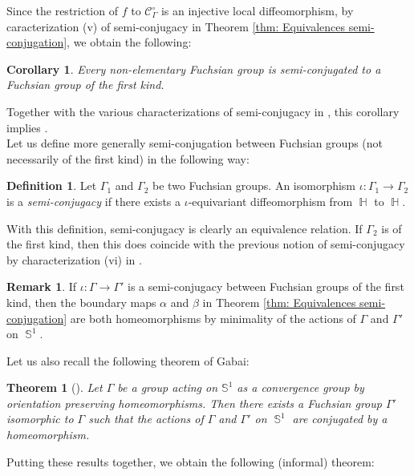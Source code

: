\documentclass{amsart}
\theoremstyle{plain}
\newtheorem{theorem}[proposition]{Theorem}
\newtheorem{corollary}[proposition]{Corollary}
\theoremstyle{definition}
\newtheorem{definition}[proposition]{Definition}
\newtheorem{remark}[proposition]{Remark}
\DeclareMathOperator{\Hb}{\mathbb{H}}
\DeclareMathOperator{\Sb}{\mathbb{S}}
\newcommand{\1}{\mathbf{1}}
\begin{document}
Since the restriction of $f$ to $\mathcal C^\circ_\Gamma$ is an injective local diffeomorphism, by caracterization (v) of semi-conjugacy in Theorem \ref{thm: Equivalences semi-conjugation}, we obtain the following:
\begin{corollary} \label{coro:Fuchsian group conjugated to first kind}
    Every non-elementary Fuchsian group is semi-conjugated to a Fuchsian group of the first kind.
\end{corollary}
Together with the various characterizations of semi-conjugacy in , this corollary implies .\\


Let us define more generally semi-conjugation between Fuchsian groups (not necessarily of the first kind) in the following way:
\begin{definition}
    Let $\Gamma_1$ and $\Gamma_2$ be two Fuchsian groups. An isomorphism $\iota\colon  \Gamma_1 \to \Gamma_2$ is a \emph{semi-conjugacy} if there exists a $\iota$-equivariant diffeomorphism from $\Hb$ to $\Hb$.
\end{definition}

With this definition, semi-conjugacy is clearly an equivalence relation.
If $\Gamma_2$ is of the first kind, then this does coincide with the previous notion of semi-conjugacy by characterization (vi) in . 

\begin{remark} \label{rmk: semiconjugation -> conjugation first kind}
    If $\iota\colon \Gamma \to \Gamma'$ is a semi-conjugacy between Fuchsian groups of the first kind, then the boundary maps $\alpha$ and $\beta$ in Theorem \ref{thm: Equivalences semi-conjugation} are both homeomorphisms by minimality of the actions of $\Gamma$ and $\Gamma'$ on $\Sb^1$. 
\end{remark}

Let us also recall the following theorem of Gabai: 
\begin{theorem}[\cite{Gabai92}]
\label{thm: Gabai}
    Let $\Gamma$ be a group acting on $\mathbb S^1$ as a convergence group by orientation preserving homeomorphisms. Then there exists a Fuchsian group $\Gamma'$ isomorphic to $\Gamma$ such that the actions of $\Gamma$ and $\Gamma'$ on $\Sb^1$ are conjugated by a homeomorphism.
\end{theorem}

Putting these results together, we obtain the following (informal) theorem:
\end{document}
